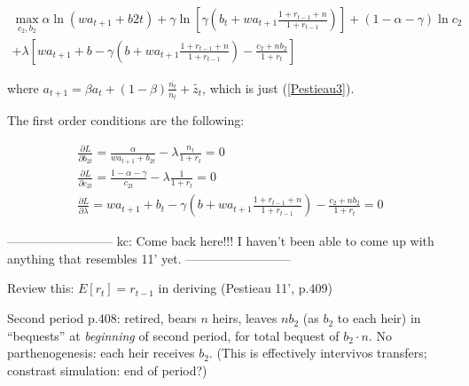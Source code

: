 \documentclass{article}
\begin{document}

\begin{gather*}
\max_{c_{2}, b_{2}}\alpha \ln (w a_{t+1} + b{2t}) 
+ \gamma \ln [ \gamma(b_t+w a_{t+1} \frac{1+r_{t-1}+n}{1+r_{t-1}}) ] 
+ (1-\alpha-\gamma) \ln c_{2}\\ 
+ \lambda [ w a_{t+1} + b - \gamma(b+w a_{t+1} \frac{1+r_{t-1}+n}{1+r_{t-1}} ) - \frac{c_{2} + n b_{2}}{1+r_t}]
\end{gather*}



where $a_{t+1} = \beta a_t + (1-\beta)\frac{\overline{n_{t}}}{n_t}+\widetilde{z_t}$, which is just (\ref{Pestieau3}).   

The first order conditions are the following:

\begin{eqnarray}
\frac{\partial L}{\partial b_{2t}} = \frac{\alpha}{w a_{t+1} + b_{2t}} - \lambda \frac{n_t}{1+r_t} = 0\\
\frac{\partial L}{\partial c_{2t}} = \frac{1-\alpha-\gamma}{c_{2t}}-\lambda\frac{1}{1+r_t} = 0\\
\frac{\partial L}{\partial \lambda} = w a_{t+1} + b_t - \gamma(b+w a_{t+1} \frac{1+r_{t-1}+n}{1+r_{t-1}} ) - \frac{c_{2} + n b_{2}}{1+r_t} = 0
\end{eqnarray}



--------------------------\newline
kc: Come back here!!! I haven't been able to come up with anything that resembles 11' yet.\newline
--------------------------


Review this:
$E[r_t] = r_{t-1}$ in deriving (Pestieau 11',  p.409)

Second period p.408:
retired,
bears $n$ heirs,
leaves $n b_{2}$ (as $b_{2}$ to each heir) in ``bequests'' at \emph{beginning} of second period,
for total bequest of $b_{2} \cdot n$.
No parthenogenesis: each heir receives $b_{2}$.
(This is effectively intervivos transfers;
constrast simulation: end of period?)\newline
\end{document}
